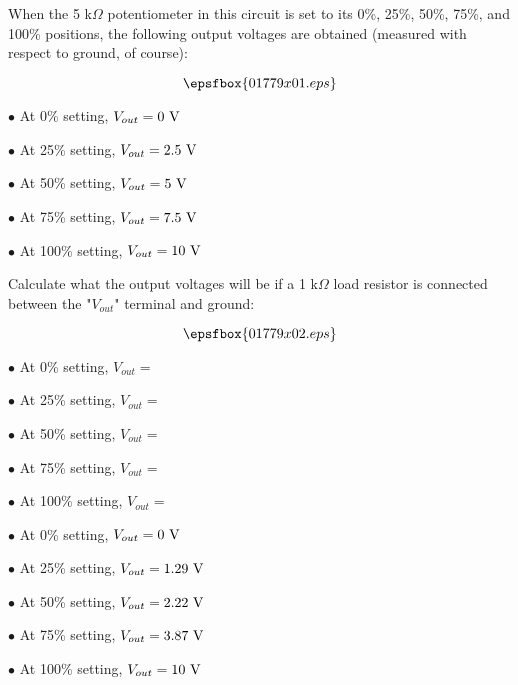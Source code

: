 

When the 5 k$\Omega$ potentiometer in this circuit is set to its 0\%, 25\%, 50\%, 75\%, and 100\% positions, the following output voltages are obtained (measured with respect to ground, of course):

$$\epsfbox{01779x01.eps}$$

\medskip
\item{$\bullet$} At 0\% setting, $V_{out} = 0 \hbox{ V}$
\item{$\bullet$} At 25\% setting, $V_{out} = 2.5 \hbox{ V}$
\item{$\bullet$} At 50\% setting, $V_{out} = 5 \hbox{ V}$
\item{$\bullet$} At 75\% setting, $V_{out} = 7.5 \hbox{ V}$
\item{$\bullet$} At 100\% setting, $V_{out} = 10 \hbox{ V}$
\medskip

Calculate what the output voltages will be if a 1 k$\Omega$ load resistor is connected between the "$V_{out}$" terminal and ground:

$$\epsfbox{01779x02.eps}$$

\medskip
\item{$\bullet$} At 0\% setting, $V_{out} = $
\item{$\bullet$} At 25\% setting, $V_{out} = $
\item{$\bullet$} At 50\% setting, $V_{out} = $
\item{$\bullet$} At 75\% setting, $V_{out} = $
\item{$\bullet$} At 100\% setting, $V_{out} = $
\medskip







\item{$\bullet$} At 0\% setting, $V_{out} = 0 \hbox{ V}$
\item{$\bullet$} At 25\% setting, $V_{out} = 1.29 \hbox{ V}$
\item{$\bullet$} At 50\% setting, $V_{out} = 2.22 \hbox{ V}$
\item{$\bullet$} At 75\% setting, $V_{out} = 3.87 \hbox{ V}$
\item{$\bullet$} At 100\% setting, $V_{out} = 10 \hbox{ V}$

